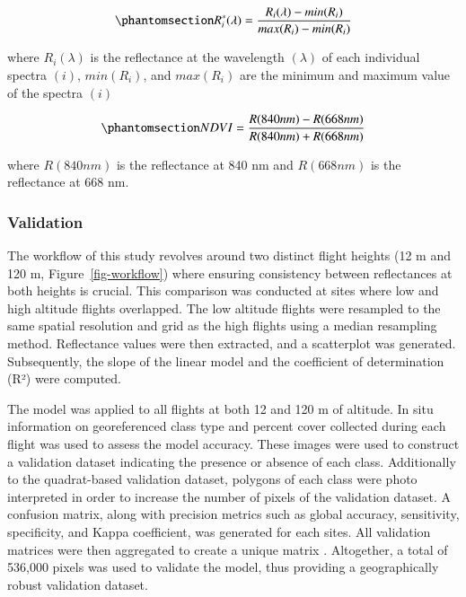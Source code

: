 \documentclass[
  number]{elsarticle}
\begin{document}
\begin{equation}\phantomsection\label{eq-std}{
R_{i}^{*}(\lambda) = \frac{R_{i}(\lambda) - min(R_{i})}{max(R_{i})- min(R_{i})}
}\end{equation}

where \(R_{i}(\lambda)\) is the reflectance at the wavelength
\((\lambda)\) of each individual spectra \((i)\), \(min(R_{i})\), and
\(max(R_{i})\) are the minimum and maximum value of the spectra \((i)\)

\begin{equation}\phantomsection\label{eq-ndvi}{
NDVI = \frac{R(840nm)-R(668nm)}{R(840nm)+R(668nm)}
}\end{equation}

where \(R(840nm)\) is the reflectance at 840 nm and \(R(668nm)\) is the
reflectance at 668 nm.

\subsubsection{Validation}\label{validation}

The workflow of this study revolves around two distinct flight heights
(12 m and 120 m, Figure~\ref{fig-workflow}) where ensuring consistency
between reflectances at both heights is crucial. This comparison was
conducted at sites where low and high altitude flights overlapped. The
low altitude flights were resampled to the same spatial resolution and
grid as the high flights using a median resampling method. Reflectance
values were then extracted, and a scatterplot was generated.
Subsequently, the slope of the linear model and the coefficient of
determination (R²) were computed.

The model was applied to all flights at both 12 and 120 m of altitude.
In situ information on georeferenced class type and percent cover
collected during each flight was used to assess the model accuracy.
These images were used to construct a validation dataset indicating the
presence or absence of each class. Additionally to the quadrat-based
validation dataset, polygons of each class were photo interpreted in
order to increase the number of pixels of the validation dataset. A
confusion matrix, along with precision metrics such as global accuracy,
sensitivity, specificity, and Kappa coefficient, was generated for each
sites. All validation matrices were then aggregated to create a unique
matrix . Altogether, a total of 536,000 pixels was used to validate the
model, thus providing a geographically robust validation dataset.
\end{document}
